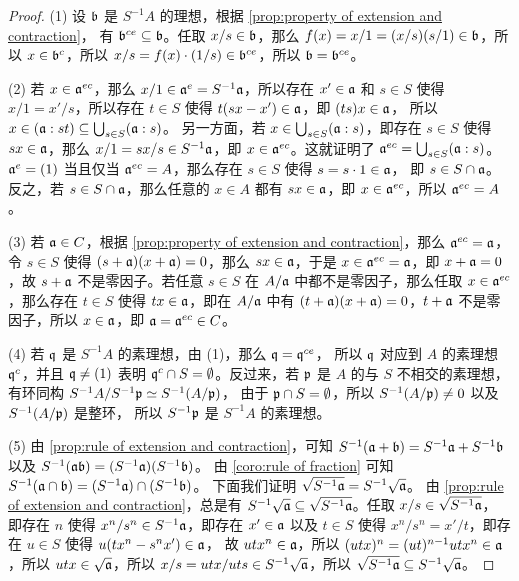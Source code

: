\begin{proof}
  (1) 设 $\mathfrak{b}$ 是 $S^{-1}A$ 的理想，根据 \autoref{prop:property of extension and contraction}，
  有 $\mathfrak{b}^{ce}\subseteq \mathfrak{b}$。任取 $x/s\in\mathfrak{b}$，那么
  $f(x)=x/1=(x/s)(s/1)\in\mathfrak{b}$，所以 $x\in\mathfrak{b}^c$，所以
  $x/s=f(x)\cdot (1/s)\in\mathfrak{b}^{ce}$，所以
  $\mathfrak{b}=\mathfrak{b}^{ce}$。

  (2) 若 $x\in\mathfrak{a}^{ec}$，那么 $x/1\in\mathfrak{a}^e=S^{-1}\mathfrak{a}$，所以存在
  $x'\in\mathfrak{a}$ 和 $s\in S$ 使得 $x/1=x'/s$，所以存在 $t\in S$ 使得
  $t(sx-x')\in\mathfrak{a}$，即 $(ts)x\in\mathfrak{a}$，
  所以 $x\in (\mathfrak{a}:st)\subseteq\bigcup_{s\in S}(\mathfrak{a}:s)$。
  另一方面，若 $x\in\bigcup_{s\in S}(\mathfrak{a}:s)$，即存在 $s\in S$
  使得 $sx\in\mathfrak{a}$，那么 $x/1=sx/s\in S^{-1}\mathfrak{a}$，即
  $x\in\mathfrak{a}^{ec}$。这就证明了 $\mathfrak{a}^{ec}=\bigcup_{s\in S}(\mathfrak{a}:s)$。
  $\mathfrak{a}^e=(1)$ 当且仅当 $\mathfrak{a}^{ec}=A$，那么存在 $s\in S$ 使得 $s=s\cdot 1\in\mathfrak{a}$，
  即 $s\in S\cap\mathfrak{a}$。反之，若 $s\in S\cap\mathfrak{a}$，那么任意的 $x\in A$ 都有
  $sx\in\mathfrak{a}$，即 $x\in\mathfrak{a}^{ec}$，所以 $\mathfrak{a}^{ec}=A$。

  (3) 若 $\mathfrak{a}\in C$，根据 \autoref{prop:property of extension and contraction}，那么 
  $\mathfrak{a}^{ec}=\mathfrak{a}$，令 $s\in S$ 使得 $(s+\mathfrak{a})(x+\mathfrak{a})=0$，那么
  $sx\in\mathfrak{a}$，于是 $x\in\mathfrak{a}^{ec}=\mathfrak{a}$，即 $x+\mathfrak{a}=0$，故 $s+\mathfrak{a} $
  不是零因子。若任意 $s\in S$ 在 $A/\mathfrak{a}$ 中都不是零因子，那么任取
  $x\in\mathfrak{a}^{ec}$，那么存在 $t\in S$ 使得 $tx\in\mathfrak{a}$，即在 $A/\mathfrak{a}$ 中有
  $(t+\mathfrak{a})(x+\mathfrak{a})=0$，$t+\mathfrak{a}$ 不是零因子，所以 $x\in\mathfrak{a}$，即
  $\mathfrak{a}=\mathfrak{a}^{ec}\in C$。

  (4) 若 $\mathfrak{q}$ 是 $S^{-1}A$ 的素理想，由 (1)，那么 $\mathfrak{q}=\mathfrak{q}^{ce}$，
  所以 $\mathfrak{q}$ 对应到 $A$ 的素理想 $\mathfrak{q}^c$，并且 $\mathfrak{q}\neq (1)$
  表明 $\mathfrak{q}^c\cap S=\emptyset$。反过来，若 $\mathfrak{p}$ 是 $A$ 的与
  $S$ 不相交的素理想，有环同构 $S^{-1}A/S^{-1}\mathfrak{p}\simeq S^{-1}(A/\mathfrak{p})$，
  由于 $\mathfrak{p}\cap S=\emptyset$，所以 $S^{-1}(A/\mathfrak{p})\neq 0$ 以及 $S^{-1}(A/\mathfrak{p})$ 是整环，
  所以 $S^{-1}\mathfrak{p}$ 是 $S^{-1}A$ 的素理想。

  (5) 由 \autoref{prop:rule of extension and contraction}，可知 
  $S^{-1}(\mathfrak{a}+\mathfrak{b})=S^{-1}\mathfrak{a}+S^{-1}\mathfrak{b}$ 以及
  $S^{-1}(\mathfrak{a}\mathfrak{b})=(S^{-1}\mathfrak{a})(S^{-1}\mathfrak{b})$。
  由 \autoref{coro:rule of fraction} 
  可知 $S^{-1}(\mathfrak{a}\cap\mathfrak{b})=(S^{-1}\mathfrak{a})\cap (S^{-1}\mathfrak{b})$。
  下面我们证明 $\sqrt{S^{-1}\mathfrak{a}}=S^{-1}\sqrt{\mathfrak{a}}$。
  由 \autoref{prop:rule of extension and contraction}，总是有
  $S^{-1}\sqrt{\mathfrak{a}}\subseteq \sqrt{S^{-1}\mathfrak{a}}$。任取 $x/s\in\sqrt{S^{-1}\mathfrak{a}}$，
  即存在 $n$ 使得 $x^n/s^n\in S^{-1}\mathfrak{a}$，即存在 $x'\in\mathfrak{a}$ 以及 $t\in S$
  使得 $x^n/s^n=x'/t$，即存在 $u\in S$ 使得 $u(tx^n-s^nx')\in\mathfrak{a}$，
  故 $utx^n\in\mathfrak{a}$，所以 $(utx)^n=(ut)^{n-1}utx^n\in\mathfrak{a}$，所以
  $utx\in\sqrt{\mathfrak{a}}$，所以 $x/s=utx/uts\in S^{-1}\sqrt{\mathfrak{a}}$，所以
  $\sqrt{S^{-1}\mathfrak{a}}\subseteq S^{-1}\sqrt{\mathfrak{a}}$。
\end{proof}

